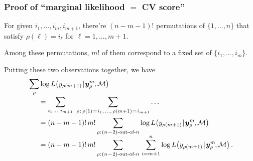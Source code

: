 \documentclass[18pt]{beamer}
\newcommand{\defineTightSpacing}{%
	\setlength{\abovedisplayskip}{.25\baselineskip}%
	\setlength{\belowdisplayskip}{.25\baselineskip}%
}
\newcommand{\given}{\thinnerspace | \thinnerspace}
\newcommand{\spacedColon}{\mkern .5mu : \mkern 1mu}
\newcommand{\spacedEq}{\mkern 1mu = \mkern 1.5mu}
\newcommand{\thinnerspace}{\mskip.5\thinmuskip}
\newcommand{\negthinnerspace}{\mskip-.5\thinmuskip}
\newcommand{\likelihood}{L}
\newcommand{\by}{\bm{y}}
\newcommand{\modelSymbol}{\mathcal{M}}
\newcommand{\permutation}{\rho}
\newcommand{\trainingSize}{m}
\newcommand{\testSampleIndex}{i}
\begin{document}
\begin{frame}
\frametitle{Proof of ``marginal likelihood $=$ {\large CV} score''}
%

For given $\testSampleIndex_1, \ldots, \testSampleIndex_\trainingSize, \testSampleIndex_{\trainingSize + 1}$, there're $(n - \trainingSize - 1)!$ permutations of $\{1, \ldots, n\}$ that satisfy $\permutation(\ell) = \testSampleIndex_\ell$ for $\ell = 1, \ldots, \trainingSize + 1$.

Among these permutations, $\trainingSize!$ of them correspond to a fixed set of $\{ \testSampleIndex_1, \ldots, \testSampleIndex_\trainingSize \}$.

Putting these two observations together, we have
\vspace*{-.15\baselineskip}
\begin{equation*} %
\begin{aligned}
&\sum_\permutation \log \likelihood\!\left(y_{\permutation(\trainingSize + 1)} \given \by_\permutation^\trainingSize\negthinnerspace, \modelSymbol \right) \\[-.2\baselineskip]
&\hspace*{1.5em}= \sum_{\testSampleIndex_1 \thinnerspace \ldots, \thinnerspace \testSampleIndex_{\trainingSize + 1}} \ 
	\sum_{\permutation \thinnerspace : \, \permutation(1) \spacedEq \testSampleIndex_1, \, \ldots, \, \permutation(\trainingSize + 1) \spacedEq \testSampleIndex_{\trainingSize + 1}} \ldots \\
&\hspace*{1.5em}= (n - \trainingSize - 1)! \, \trainingSize! 
	\sum_{\permutation \spacedColon \text{$(n\!-\!2)$-out-of-$n$}} \log \likelihood\!\left(y_{\permutation(\trainingSize + 1)} \given \by_\permutation^\trainingSize\negthinnerspace, \modelSymbol \right) \\[-.3\baselineskip]
&\hspace*{1.5em}= (n - \trainingSize - 1)! \, \trainingSize! 
	\sum_{\permutation \spacedColon \text{$(n\!-\!2)$-out-of-$n$}} \, \sum_{\testSampleIndex = \trainingSize + 1}^n
		\log \likelihood\!\left(y_{\permutation(\trainingSize + 1)} \given \by_\permutation^\trainingSize\negthinnerspace, \modelSymbol \right).
\end{aligned}
\end{equation*}
\end{frame}
\end{document}
